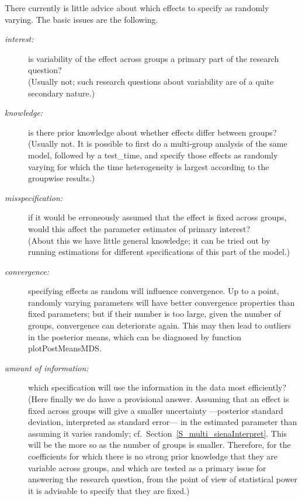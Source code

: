\documentclass[a4paper,fleqn,11pt]{article}
\newcommand{\+}{\, + \,}
\newcommand{\sfn}[1]{\textsf{#1}}
\begin{document}
There currently is little advice about which effects to specify
as randomly varying.
The basic issues are the following.
\begin{description}
\item[\emph{interest:}] is variability of the effect across groups
   a primary part of the research question?\\
   (Usually not; such research questions about variability
   are of a quite secondary nature.)
\item[\emph{knowledge:}] is there prior knowledge about whether
   effects differ between groups?\\
   (Usually not. It is possible to first do a multi-group analysis of the same model,
   followed by a \textsf{test\_time}, and specify those effects as randomly
   varying for which the time heterogeneity is largest according to the
   groupwise results.)
\item[\emph{misspecification:}] if it would be erroneously assumed
    that the effect is fixed across groups, would this affect
    the parameter estimates of primary interest?\\
    (About this we have little general knowledge; it can be tried out
    by running estimations for different specifications of this
    part of the model.)
\item[\emph{convergence:}] specifying effects as random will
    influence convergence. Up to a point, randomly varying parameters
    will have better convergence properties than fixed parameters;
    but if their number is too large, given the number of groups,
    convergence can deteriorate again.
    This may then lead to outliers in the posterior means,
    which can be diagnosed by function \sfn{plotPostMeansMDS}.
\item[\emph{amount of information:}] which specification will
     use the information in the data most efficiently?\\
     (Here finally we do have a provisional answer. Assuming that an effect is fixed
     across groups will give a smaller uncertainty ---posterior standard
     deviation, interpreted as standard error--- in the estimated parameter
     than assuming it varies randomly;
     cf.\ Section~\ref{S_multi_sienaInterpret}.
     This will be the more so as the number of
     groups is smaller. Therefore, for the coefficients for which
     there is no strong prior knowledge that they are variable across groups,
     and which are tested as a primary issue for answering the research question,
     from the point of view of statistical power
     it is advisable to specify that they are fixed.)
\end{description}
\end{document}
